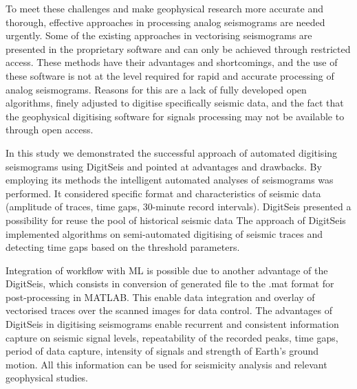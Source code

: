 \documentclass[informatics,article,submit,moreauthors,pdftex]{Definitions/mdpi}
\begin{document}
To meet these challenges and make geophysical research more accurate and thorough, effective approaches in processing analog seismograms are needed urgently. Some of the existing approaches in vectorising seismograms are presented in the proprietary software and can only be achieved through restricted access. These methods have their advantages and shortcomings, and the use of these software is not at the level required for rapid and accurate processing of analog seismograms. Reasons for this are a lack of fully developed open algorithms, finely adjusted to digitise specifically seismic data, and the fact that the geophysical digitising software for signals processing may not be available to through open access. 

In this study we demonstrated the successful approach of automated digitising seismograms using DigitSeis and pointed at advantages and drawbacks. By employing its methods the intelligent automated analyses of seismograms was performed. It considered specific format and characteristics of seismic data (amplitude of traces, time gaps, 30-minute record intervals). DigitSeis presented a possibility for reuse the pool of historical seismic data The approach of DigitSeis implemented algorithms on semi-automated digitising of seismic traces and detecting time gaps based on the threshold parameters. 

Integration of workflow with \ac{ML} is possible due to another advantage of the DigitSeis, which consists in conversion of generated file to the .mat format for post-processing in MATLAB. This enable data integration and overlay of vectorised traces over the scanned images for data control. The advantages of DigitSeis in digitising seismograms enable recurrent and consistent information capture on seismic signal levels, repeatability of the recorded peaks, time gaps, period of data capture, intensity of signals and strength of Earth's ground motion. All this information can be used for seismicity analysis and relevant geophysical studies. 


\vspace{6pt} 

\end{document}
